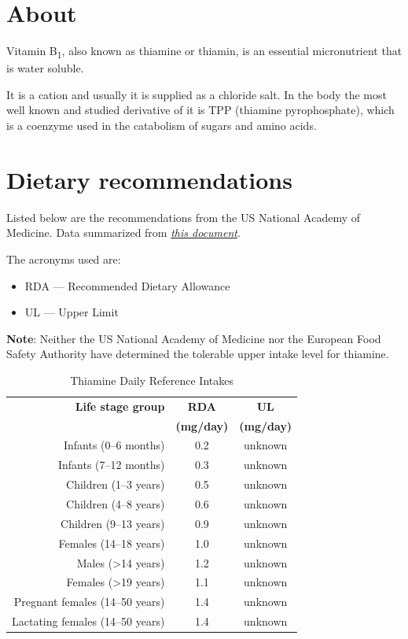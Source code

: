 \documentclass{book}
\begin{document}
\begin{sloppypar}
\section{About}
Vitamin B\textsubscript{1}, also known as thiamine or thiamin, is an essential micronutrient that is water soluble.

It is a cation and usually it is supplied as a chloride salt. In the body the most well known and studied derivative of it is TPP (thiamine pyrophosphate), which is a coenzyme used in the catabolism of sugars and amino acids.

\section{Dietary recommendations}
Listed below are the recommendations from the US National Academy of Medicine. Data summarized from \href{https://nap.nationalacademies.org/read/6015/chapter/6}{\textit{this document}}.

The acronyms used are:
\begin{itemize}
	\item RDA --- Recommended Dietary Allowance
	\item UL --- Upper Limit
\end{itemize}

\textbf{Note}: Neither the US National Academy of Medicine nor the European Food Safety Authority have determined the tolerable upper intake level for thiamine.

\begin{table}[ht]
	\caption{Thiamine Daily Reference Intakes}
	\centering \begin{tabular}{| r | c | c |}
		\hline
		\textbf{Life stage group} & \textbf{RDA} & \textbf{UL}\\ 
		& \textbf{(mg/day)} & \textbf{(mg/day)}\\ \hline
		Infants (0--6 months) & 0.2 & unknown\\ \hline
		Infants (7--12 months) & 0.3 & unknown\\ \hline
		Children (1--3 years) & 0.5 & unknown\\ \hline
		Children (4--8 years) & 0.6 & unknown\\ \hline
		Children (9--13 years) & 0.9 & unknown\\ \hline
		Females (14--18 years) & 1.0 & unknown\\ \hline
		Males (\textgreater14 years) & 1.2 & unknown\\ \hline
		Females (\textgreater19 years) & 1.1 & unknown\\ \hline
		Pregnant females (14--50 years) & 1.4 & unknown\\ \hline
		Lactating females (14--50 years) & 1.4 & unknown\\ \hline
	\end{tabular}
\end{table}
\newpage


\end{sloppypar}
\end{document}
